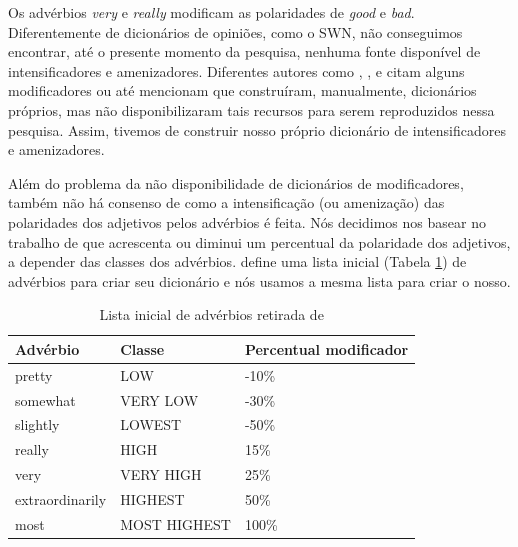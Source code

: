 Os advérbios \textit{very} e \textit{really} modificam as polaridades de \textit{good} e \textit{bad}. Diferentemente de dicionários de opiniões, como o SWN, não conseguimos encontrar, até o presente momento da pesquisa, nenhuma fonte disponível de intensificadores e amenizadores. Diferentes autores como , ,  e  citam alguns modificadores ou até mencionam que construíram, manualmente, dicionários próprios, mas não disponibilizaram tais recursos para serem reproduzidos nessa pesquisa. Assim, tivemos de construir nosso próprio dicionário de intensificadores e amenizadores. 

Além do problema da não disponibilidade de dicionários de modificadores, também não há consenso de como a intensificação (ou amenização) das polaridades dos adjetivos pelos advérbios é feita. Nós decidimos nos basear no trabalho de  que acrescenta ou diminui um percentual da polaridade dos adjetivos, a depender das classes dos advérbios.  define uma lista inicial (Tabela \ref{table:adv_seed}) de advérbios para criar seu dicionário e nós usamos a mesma lista para criar o nosso.

\begin{table}[!h]
	\centering
    \begin{tabular}{lll}
    Advérbio         				& Classe          & Percentual modificador \\ \hline
    pretty                   			& LOW 			   & -10\% \\
    somewhat                   	& VERY LOW  & -30\% \\
    slightly                   		& LOWEST 	   & -50\% \\
    really                   			& HIGH 			   & 15\% \\
    very                   			& VERY HIGH &  25\% \\
    extraordinarily             & HIGHEST 	   & 50\% \\
    most                   			& MOST HIGHEST & 100\% \\
    \end{tabular}
    \caption{Lista inicial de advérbios retirada de \cite{taboada2011lexicon}}
	\label{table:adv_seed}
\end{table}

